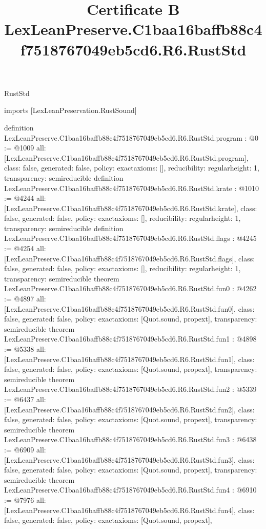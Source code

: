 \begin{lexlean}{RustStd}
\title{Certificate B LexLeanPreserve.C1baa16baffb88c4f7518767049eb5cd6.R6.RustStd}
\begin{coremodule}
imports [LexLeanPreservation.RustSound]

definition LexLeanPreserve.C1baa16baffb88c4f7518767049eb5cd6.R6.RustStd.program : @0 := @1009 {
  all: [LexLeanPreserve.C1baa16baffb88c4f7518767049eb5cd6.R6.RustStd.program],
  class: false,
  generated: false,
  policy: exact{axioms: []},
  reducibility: regular{height: 1},
  transparency: semireducible
}
definition LexLeanPreserve.C1baa16baffb88c4f7518767049eb5cd6.R6.RustStd.krate : @1010 := @4244 {
  all: [LexLeanPreserve.C1baa16baffb88c4f7518767049eb5cd6.R6.RustStd.krate],
  class: false,
  generated: false,
  policy: exact{axioms: []},
  reducibility: regular{height: 1},
  transparency: semireducible
}
definition LexLeanPreserve.C1baa16baffb88c4f7518767049eb5cd6.R6.RustStd.flags : @4245 := @4254 {
  all: [LexLeanPreserve.C1baa16baffb88c4f7518767049eb5cd6.R6.RustStd.flags],
  class: false,
  generated: false,
  policy: exact{axioms: []},
  reducibility: regular{height: 1},
  transparency: semireducible
}
theorem LexLeanPreserve.C1baa16baffb88c4f7518767049eb5cd6.R6.RustStd.fun0 : @4262 := @4897 {
  all: [LexLeanPreserve.C1baa16baffb88c4f7518767049eb5cd6.R6.RustStd.fun0],
  class: false,
  generated: false,
  policy: exact{axioms: [Quot.sound, propext]},
  transparency: semireducible
}
theorem LexLeanPreserve.C1baa16baffb88c4f7518767049eb5cd6.R6.RustStd.fun1 : @4898 := @5338 {
  all: [LexLeanPreserve.C1baa16baffb88c4f7518767049eb5cd6.R6.RustStd.fun1],
  class: false,
  generated: false,
  policy: exact{axioms: [Quot.sound, propext]},
  transparency: semireducible
}
theorem LexLeanPreserve.C1baa16baffb88c4f7518767049eb5cd6.R6.RustStd.fun2 : @5339 := @6437 {
  all: [LexLeanPreserve.C1baa16baffb88c4f7518767049eb5cd6.R6.RustStd.fun2],
  class: false,
  generated: false,
  policy: exact{axioms: [Quot.sound, propext]},
  transparency: semireducible
}
theorem LexLeanPreserve.C1baa16baffb88c4f7518767049eb5cd6.R6.RustStd.fun3 : @6438 := @6909 {
  all: [LexLeanPreserve.C1baa16baffb88c4f7518767049eb5cd6.R6.RustStd.fun3],
  class: false,
  generated: false,
  policy: exact{axioms: [Quot.sound, propext]},
  transparency: semireducible
}
theorem LexLeanPreserve.C1baa16baffb88c4f7518767049eb5cd6.R6.RustStd.fun4 : @6910 := @7976 {
  all: [LexLeanPreserve.C1baa16baffb88c4f7518767049eb5cd6.R6.RustStd.fun4],
  class: false,
  generated: false,
  policy: exact{axioms: [Quot.sound, propext]},
}
\end{coremodule}
\end{lexlean}
